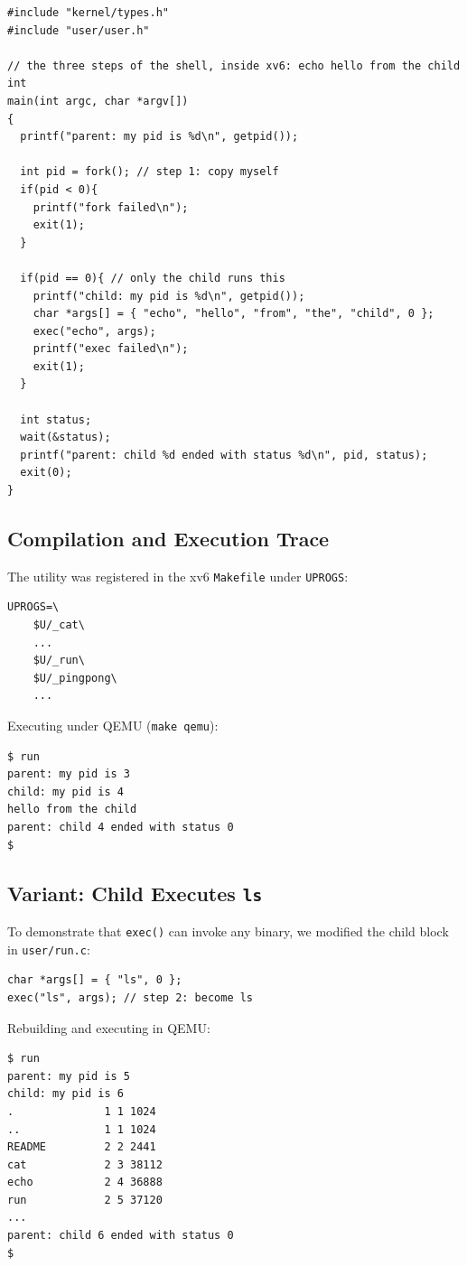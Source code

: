 \documentclass[12pt,a4paper]{article}
\begin{document}
\begin{lstlisting}[style=cstyle]
#include "kernel/types.h"
#include "user/user.h"

// the three steps of the shell, inside xv6: echo hello from the child
int
main(int argc, char *argv[])
{
  printf("parent: my pid is %d\n", getpid());

  int pid = fork(); // step 1: copy myself
  if(pid < 0){
    printf("fork failed\n");
    exit(1);
  }

  if(pid == 0){ // only the child runs this
    printf("child: my pid is %d\n", getpid());
    char *args[] = { "echo", "hello", "from", "the", "child", 0 };
    exec("echo", args);
    printf("exec failed\n");
    exit(1);
  }

  int status;
  wait(&status);
  printf("parent: child %d ended with status %d\n", pid, status);
  exit(0);
}
\end{lstlisting}

\subsection{Compilation and Execution Trace}
The utility was registered in the xv6 \texttt{Makefile} under \texttt{UPROGS}:
\begin{lstlisting}[style=consolestyle]
UPROGS=\
    $U/_cat\
    ...
    $U/_run\
    $U/_pingpong\
    ...
\end{lstlisting}

Executing under QEMU (\texttt{make qemu}):
\begin{lstlisting}[style=consolestyle]
$ run
parent: my pid is 3
child: my pid is 4
hello from the child
parent: child 4 ended with status 0
$
\end{lstlisting}

\subsection{Variant: Child Executes \texttt{ls}}
To demonstrate that \texttt{exec()} can invoke any binary, we modified the child block in \texttt{user/run.c}:
\begin{lstlisting}[style=cstyle]
char *args[] = { "ls", 0 };
exec("ls", args); // step 2: become ls
\end{lstlisting}

Rebuilding and executing in QEMU:
\begin{lstlisting}[style=consolestyle]
$ run
parent: my pid is 5
child: my pid is 6
.              1 1 1024
..             1 1 1024
README         2 2 2441
cat            2 3 38112
echo           2 4 36888
run            2 5 37120
...
parent: child 6 ended with status 0
$
\end{lstlisting}
\end{document}
